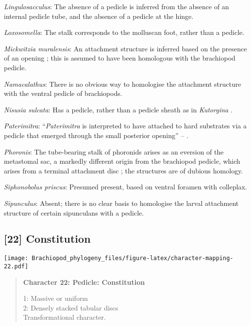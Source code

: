 \documentclass[openany]{book}
\theoremstyle{definition}
\theoremstyle{definition}
\theoremstyle{definition}
\theoremstyle{remark}
\begin{document}
\hypertarget{Lingulosacculus-coding-21}{}
\emph{Lingulosacculus}: The absence of a pedicle is inferred from the
absence of an internal pedicle tube, and the absence of a pedicle at the
hinge.

\hypertarget{Loxosomella-coding-21}{}
\emph{Loxosomella}: The stalk corresponds to the molluscan foot, rather
than a pedicle.

\hypertarget{Mickwitzia_muralensis-coding-21}{}
\emph{Mickwitzia muralensis}: An attachment structure is inferred based
on the presence of an opening \citep{Balthasar2004Shellstructure}; this
is assumed to have been homologous with the brachiopod pedicle.

\hypertarget{Namacalathus-coding-21}{}
\emph{Namacalathus}: There is no obvious way to homologise the
attachment structure with the ventral pedicle of brachiopods.

\hypertarget{Nisusia_sulcata-coding-21}{}
\emph{Nisusia sulcata}: Has a pedicle, rather than a pedicle sheath as
in \emph{Kutorgina}
\citep{Holmer2018Evolutionarysignificance, Holmer2018Theattachment}.

\hypertarget{Paterimitra-coding-21}{}
\emph{Paterimitra}: ``\emph{Paterimitra} is interpreted to have attached
to hard substrates via a pedicle that emerged through the small
posterior opening'' -- \citet{Skovsted2009Thescleritome}.

\hypertarget{Phoronis-coding-21}{}
\emph{Phoronis}: The tube-bearing stalk of phoronids arises as an
eversion of the metastomal sac, a markedly different origin from the
brachiopod pedicle, which arises from a terminal attachment disc
\citep{Young2002}; the structures are of dubious homology.

\hypertarget{Siphonobolus_priscus-coding-21}{}
\emph{Siphonobolus priscus}: Presumed present, based on ventral foramen
with colleplax.

\hypertarget{Sipunculus-coding-21}{}
\emph{Sipunculus}: Absent; there is no clear basis to homologise the
larval attachment structure of certain sipunculans with a pedicle.

\subsection*{{[}22{]} Constitution}\label{constitution-1}

\texttt{[image: Brachiopod\_phylogeny\_files/figure-latex/character-mapping-22.pdf]}

\begin{quote}
\textbf{Character 22: Pedicle: Constitution}

1: Massive or uniform\\
2: Densely stacked tabular discs\\
Transformational character.
\end{quote}
\end{document}
